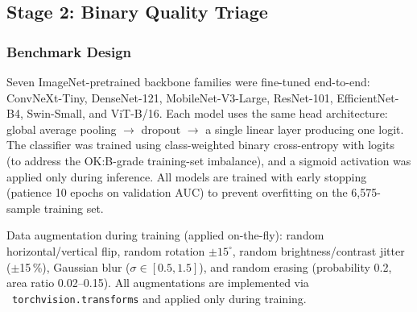 \documentclass[conference]{IEEEtran}
\begin{document}
\subsection{Stage 2: Binary Quality Triage}
\label{sec:stage2}

\subsubsection{Benchmark Design}
Seven ImageNet-pretrained backbone families were fine-tuned end-to-end: ConvNeXt-Tiny, DenseNet-121, MobileNet-V3-Large, ResNet-101, EfficientNet-B4, Swin-Small, and ViT-B/16. Each model uses the same head architecture: global average pooling $\to$ dropout $\to$ a single linear layer producing one logit. The classifier was trained using class-weighted binary cross-entropy with logits (to address the OK:B-grade training-set imbalance), and a sigmoid activation was applied only during inference. All models are trained with early stopping (patience 10 epochs on validation AUC) to prevent overfitting on the 6{,}575-sample training set.

Data augmentation during training (applied on-the-fly): random horizontal/vertical flip, random rotation $\pm15^\circ$, random brightness/contrast jitter ($\pm$15\,\%), Gaussian blur ($\sigma \in [0.5, 1.5]$), and random erasing (probability 0.2, area ratio 0.02--0.15). All augmentations are implemented via \ \texttt{torchvision.transforms} and applied only during training.
\end{document}
